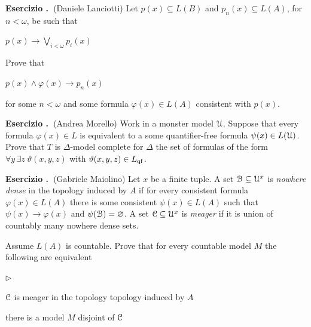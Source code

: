 \documentclass[10pt]{article}
\def\phi{\varphi}
\def\theta{\vartheta}
\def\B{\EuScript B}
\def\C{\EuScript C}
\def\U{\EuScript U}
\def\E{\exists}
\def\A{\forall}
\def\imp{\rightarrow}
\newcommand{\labella}[1]{{\sf\footnotesize #1}\hfill}
\renewenvironment{itemize}
  {\begin{list}{$\triangleright$}{%
   \setlength{\parskip}{0mm}
   \setlength{\topsep}{0mm}
   \setlength{\rightmargin}{0mm}
   \setlength{\listparindent}{0mm}
   \setlength{\itemindent}{0mm}
   \setlength{\labelwidth}{3ex}
   \setlength{\itemsep}{0mm}
   \setlength{\parsep}{0mm}
   \setlength{\partopsep}{0mm}
   \setlength{\labelsep}{1ex}
   \setlength{\leftmargin}{\labelwidth+\labelsep}
   \let\makelabel\labella}}{%
   \vspace*{-.3\baselineskip}
  \end{list}}
\newcounter{ex}
\newenvironment{exercise}{\bigskip\addtocounter{ex}{1}\textbf{Esercizio \theex.\ }}{}
\begin{document}
\begin{exercise}(Daniele Lanciotti)
Let $p(x)\subseteq L(B)$ and $p_n(x)\subseteq L(A)$, for $n<\omega$, be such that

\hfil$\displaystyle p(x)\imp\bigvee_{i<\omega}p_i(x)$

Prove that 

\hfil$p(x)\wedge\phi(x)\imp p_n(x)$

for some $n<\omega$ and some formula $\phi(x)\in L(A)$ consistent with $p(x)$.
\end{exercise}

\begin{exercise}(Andrea Morello)
  Work in a monster model $\U$.
  Suppose that every formula $\phi(x)\in L$ is equivalent to a some quantifier-free formula $\psi(x)\in L(\U)$.
  Prove that $T$ is $\Delta$-model complete for $\Delta$ the set of formulas of the form $\A y\,\E z\ \theta(x,y,z)$ with $\theta(x,y,z)\in L_{\rm qf}$.
\end{exercise}


\begin{exercise}(Gabriele Maiolino)
  Let $x$ be a finite tuple.
  A set $\B\subseteq\U^x$ is \textit{nowhere dense\/} in the topology induced by $A$ if for every consistent formula $\phi(x)\in L(A)$ there is some consistent $\psi(x)\in L(A)$ such that $\psi(x)\imp\phi(x)$ and $\psi(\B)=\varnothing$.
  A set $\C\subseteq\U^x$ is \textit{meager\/} if it is union of countably many nowhere dense sets.
  
  Assume $L(A)$ is countable.
  Prove that for every countable model $M$ the following are equivalent
  \begin{itemize}
    \item [1.] $\C$ is meager in the topology topology induced by $A$
    \item [2.] there is a model $M$ disjoint of $\C$
  \end{itemize}
\end{exercise}
\end{document}
